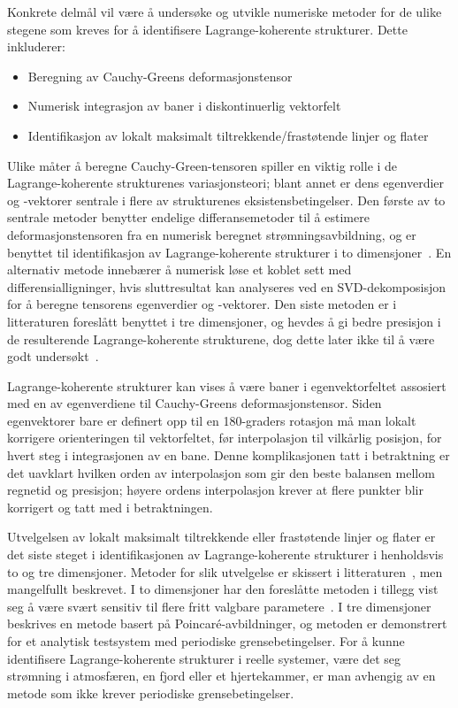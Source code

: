 Konkrete delmål vil være å undersøke og utvikle numeriske metoder for de ulike stegene som kreves for å identifisere Lagrange-koherente strukturer. Dette inkluderer:
\begin{itemize}[noitemsep]
    \item Beregning av Cauchy-Greens deformasjonstensor
    \item Numerisk integrasjon av baner i diskontinuerlig vektorfelt
    \item Identifikasjon av lokalt maksimalt tiltrekkende/frastøtende linjer og flater
\end{itemize}
Ulike måter å beregne Cauchy-Green-tensoren spiller en viktig rolle i de Lagrange-koherente strukturenes variasjonsteori; blant annet er dens egenverdier og -vektorer sentrale i flere av strukturenes eksistensbetingelser. Den første av to sentrale metoder benytter endelige differansemetoder til å estimere deformasjonstensoren fra en numerisk beregnet strømningsavbildning, og er benyttet til identifikasjon av Lagrange-koherente strukturer i to dimensjoner~\parencite{farazmand2012computational, loken2017}. En alternativ metode innebærer å numerisk løse et koblet sett med differensialligninger, hvis sluttresultat kan analyseres ved en SVD-dekomposisjon for å beregne tensorens egenverdier og -vektorer. Den siste metoden er i litteraturen foreslått benyttet i tre dimensjoner, og hevdes å gi bedre presisjon i de resulterende Lagrange-koherente strukturene, dog dette later ikke til å være godt undersøkt~\parencite{oettinger2016autonomous}.

Lagrange-koherente strukturer kan vises å være baner i egenvektorfeltet assosiert med en av egenverdiene til Cauchy-Greens deformasjonstensor. Siden egenvektorer bare er definert opp til en 180-graders rotasjon må man lokalt korrigere orienteringen til vektorfeltet, før interpolasjon til vilkårlig posisjon, for hvert steg i integrasjonen av en bane. Denne komplikasjonen tatt i betraktning er det uavklart hvilken orden av interpolasjon som gir den beste balansen mellom regnetid og presisjon; høyere ordens interpolasjon krever at flere punkter blir korrigert og tatt med i betraktningen.

Utvelgelsen av lokalt maksimalt tiltrekkende eller frastøtende linjer og flater er det siste steget i identifikasjonen av Lagrange-koherente strukturer i henholdsvis to og tre dimensjoner. Metoder for slik utvelgelse er skissert i litteraturen~\parencite{farazmand2012computational, oettinger2016autonomous}, men mangelfullt beskrevet. I to dimensjoner har den foreslåtte metoden i tillegg vist seg å være svært sensitiv til flere fritt valgbare parametere~\parencite{loken2017}. I tre dimensjoner beskrives en metode basert på Poincar\'{e}-avbildninger, og metoden er demonstrert for et analytisk testsystem med periodiske grensebetingelser. For å kunne identifisere Lagrange-koherente strukturer i reelle systemer, være det seg strømning i atmosfæren, en fjord eller et hjertekammer, er man avhengig av en metode som ikke krever periodiske grensebetingelser.


